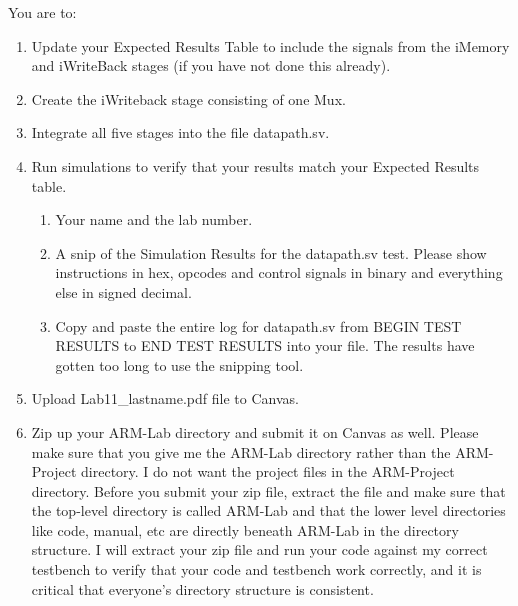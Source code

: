 You are to:
\begin{enumerate}
\item Update your Expected Results Table to include the signals from the iMemory and iWriteBack stages (if you have not done this already).
\item Create the iWriteback stage consisting of one Mux.
\item Integrate all five stages into the file datapath.sv.
\item Run simulations to verify that your results match your Expected Results table.   
	\begin{enumerate}
	\item Your name and the lab number.
	\item A snip of the Simulation Results for the datapath.sv test.  Please show instructions in hex, opcodes and control signals in binary and everything else in signed decimal.  
	\item Copy and paste the entire log for datapath.sv from BEGIN TEST RESULTS to END TEST RESULTS into your file.  The results have gotten too long to use the snipping tool.	
\end{enumerate}
\item Upload Lab11\_lastname.pdf file to Canvas.
\item Zip up your ARM-Lab directory and submit it on Canvas as well.  Please make sure that you give me the ARM-Lab directory rather than the ARM-Project directory.  I do not want the project files in the ARM-Project directory.  Before you submit your zip file, extract the file and make sure that the top-level directory is called ARM-Lab and that the lower level directories like code, manual, etc are directly beneath ARM-Lab in the directory structure.  I will extract your zip file and run your code against my correct testbench to verify that your code and testbench work correctly, and it is critical that everyone's directory structure is consistent.
\end{enumerate} 
